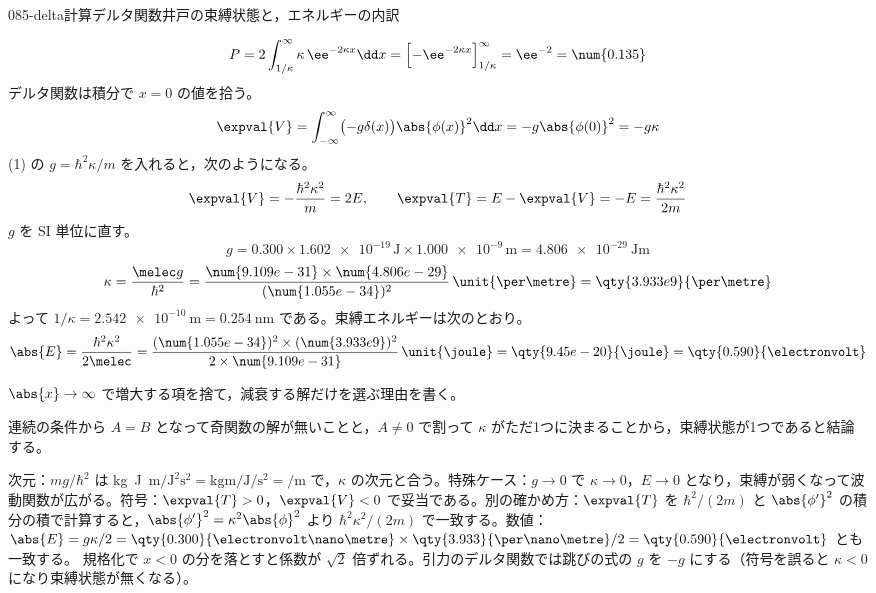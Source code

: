 \documentclass[uplatex,dvipdfmx,a4paper,11pt]{jsarticle}
\begin{document}
\begin{mondai}{085-delta}{計算}{デルタ関数井戸の束縛状態と，エネルギーの内訳}
\begin{tadashii}
\[ P=2\int_{1/\kappa}^{\infty}\kappa\,\ee^{-2\kappa x}\dd x=\Bigl[-\ee^{-2\kappa x}\Bigr]_{1/\kappa}^{\infty}=\ee^{-2}=\num{0.135} \]
 デルタ関数は積分で $x=0$ の値を拾う。
\[ \expval{V}=\int_{-\infty}^{\infty}\bigl(-g\delta(x)\bigr)\abs{\phi(x)}^{2}\dd x=-g\abs{\phi(0)}^{2}=-g\kappa \]
(1) の $g=\hbar^{2}\kappa/m$ を入れると，次のようになる。
\[ \expval{V}=-\frac{\hbar^{2}\kappa^{2}}{m}=2E,\qquad \expval{T}=E-\expval{V}=-E=\frac{\hbar^{2}\kappa^{2}}{2m} \]
 $g$ を SI 単位に直す。
\[ g=\num{0.300}\times\num{1.602e-19}\,\unit{\joule}\times\num{1.000e-9}\,\unit{\metre}=\qty{4.806e-29}{\joule\metre} \]
\[ \kappa=\frac{\melec g}{\hbar^{2}}=\frac{\num{9.109e-31}\times\num{4.806e-29}}{(\num{1.055e-34})^{2}}\,\unit{\per\metre}=\qty{3.933e9}{\per\metre} \]
よって $1/\kappa=\qty{2.542e-10}{\metre}=\qty{0.254}{\nano\metre}$ である。束縛エネルギーは次のとおり。
\[ \abs{E}=\frac{\hbar^{2}\kappa^{2}}{2\melec}=\frac{(\num{1.055e-34})^{2}\times(\num{3.933e9})^{2}}{2\times\num{9.109e-31}}\,\unit{\joule}=\qty{9.45e-20}{\joule}=\qty{0.590}{\electronvolt} \]
\begin{ronten}
  \item {} $\abs{x}\to\infty$ で増大する項を捨て，減衰する解だけを選ぶ理由を書く。
  \item {} 連続の条件から $A=B$ となって奇関数の解が無いことと，$A\ne 0$ で割って $\kappa$ がただ1つに決まることから，束縛状態が1つであると結論する。
\end{ronten}
\kenzan 次元：$mg/\hbar^{2}$ は \unit{\kilogram\joule\metre}$/\unit{\joule\squared\second\squared}=\unit{\kilogram\metre\per\joule\per\second\squared}=\unit{\per\metre}$ で，$\kappa$ の次元と合う。特殊ケース：$g\to 0$ で $\kappa\to 0$，$E\to 0$ となり，束縛が弱くなって波動関数が広がる。符号：$\expval{T}>0$，$\expval{V}<0$ で妥当である。別の確かめ方：$\expval{T}$ を $\hbar^{2}/(2m)$ と $\abs{\phi'}^{2}$ の積分の積で計算すると，$\abs{\phi'}^{2}=\kappa^{2}\abs{\phi}^{2}$ より $\hbar^{2}\kappa^{2}/(2m)$ で一致する。数値：$\abs{E}=g\kappa/2=\qty{0.300}{\electronvolt\nano\metre}\times\qty{3.933}{\per\nano\metre}/2=\qty{0.590}{\electronvolt}$ とも一致する。
\tsumazuki 規格化で $x<0$ の分を落とすと係数が $\sqrt{2}$ 倍ずれる。引力のデルタ関数では跳びの式の $g$ を $-g$ にする（符号を誤ると $\kappa<0$ になり束縛状態が無くなる）。
\end{tadashii}
\end{mondai}
\end{document}
